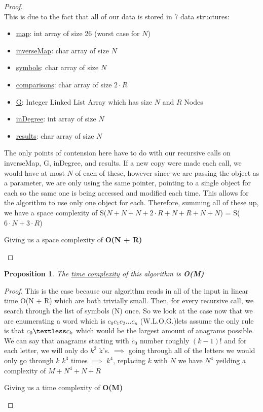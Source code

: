 \documentclass[12pt]{article}
\newtheorem{proposition}[theorem]{Proposition}
\begin{document}
\begin{proof}
~ \\ \indent This is due to the fact that all of our data is stored in 7 data structures:
\begin{itemize}
    \item \underline{map}: int array of size 26 (worst case for $N$)
    \item \underline{inverseMap}: char array of size $N$
    \item \underline{symbols}: char array of size $N$
    \item \underline{comparisons}: char array of size $2\cdot R$
    \item \underline{G}: Integer Linked List Array which has size $N$ and $R$ Nodes
    \item \underline{inDegree}: int array of size $N$
    \item \underline{results}: char array of size $N$
\end{itemize}
The only points of contension here have to do with our recursive calls on inverseMap, G, inDegree, and results. If a
new copy were made each call, we would have at most $N$ of each of these, however since we are passing the object
as a parameter, we are only using the same pointer, pointing to a single object for each so the same one is being
accessed and modified each time. This allows for the algorithm to use only one object for each. Therefore, summing
all of these up, we have a space complexity of S($N + N + N + 2\cdot R + N + R + N + N$) = S($6\cdot N + 3\cdot R$)
\begin{center}
    Giving us a space complexity of \textbf{O(N + R)}
\end{center}
\end{proof}

\begin{proposition}
\label{numq}
The \underline{time complexity} of this algorithm is \textbf{O(M)}
\end{proposition}

\begin{proof}
This is the case because our algorithm reads in all of the input in linear time O(N + R) which are both trivially small.
Then, for every recursive call, we search through the list of symbols (N) once. So we look at the case now that we are
enumerating a word which is $c_0 c_1 c_2 ... c_n$ (W.L.O.G.)lets assume the only rule is that $c_0 \textless c_k$ which
would be the largest amount of anagrams possible. We can say that anagrams starting with $c_0$ number roughly $(k-1)!$
and for each letter, we will only do $k^2$ k's. $\implies$ going through all of the letters we would only go through $k$
$k^3$ times $\implies$ $k^4$, replacing $k$ with $N$ we have $N^4$ yeilding a complexity of $M + N^4 + N + R$
\begin{center}
    Giving us a time complexity of \textbf{O(M)}
\end{center}
\end{proof}
\end{document}
